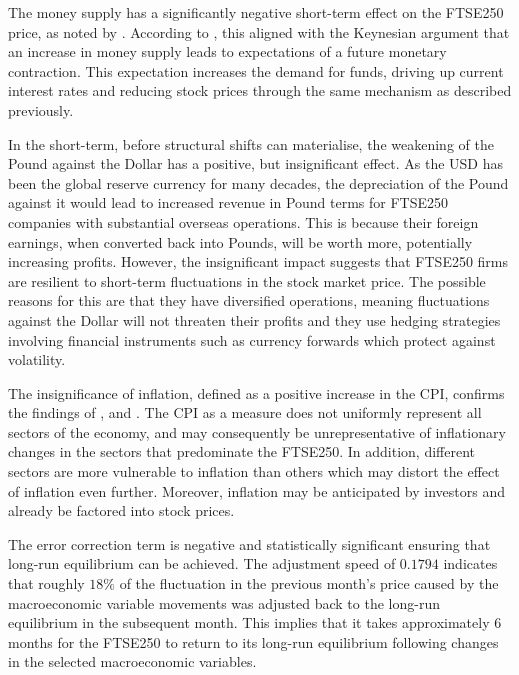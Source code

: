\documentclass[11pt,a4paper]{article}
\newcommand{\citeboth}[1]{\citeauthor{#1} \citep{#1}}
\begin{document}
The money supply has a significantly negative short-term effect on the 
FTSE250 price, as noted by \citeboth{olawale2014}. 
According to \citeboth{sellin2001}, this aligned with the Keynesian argument 
that an increase in money supply leads to expectations of a future 
monetary contraction. This expectation increases the demand for 
funds, driving up current interest rates and reducing stock prices 
through the same mechanism as described previously.

In the short-term, before structural shifts can materialise, the
weakening of the Pound against the Dollar has a positive, but 
insignificant effect. As the USD has been 
the global reserve currency for many decades, the depreciation of the Pound 
against it would lead to increased revenue in Pound terms for FTSE250 
companies with substantial overseas operations. 
This is because their foreign earnings, 
when converted back into Pounds, will be worth more, 
potentially increasing profits. However, the insignificant impact suggests 
that FTSE250 firms are resilient to short-term fluctuations in the stock market 
price. The possible reasons for this are that they have diversified 
operations, meaning fluctuations against the Dollar will not threaten 
their profits and they use hedging strategies involving financial instruments 
such as currency forwards which protect against volatility. 

The insignificance of inflation, defined as a positive 
increase in the CPI, confirms the findings of 
\citeboth{gultekin1983}, \citeboth{firth1979} and \citeboth{neifar2023}. 
The CPI as a measure does not uniformly represent all sectors of the economy, 
and may consequently be unrepresentative of inflationary changes in the 
sectors that predominate the FTSE250. In addition, different sectors 
are more vulnerable to inflation than others which may distort the effect 
of inflation even further. Moreover, inflation may be anticipated 
by investors and already be factored into stock prices.

The error correction term 
is negative and statistically significant ensuring that long-run equilibrium 
can be achieved. The adjustment speed of $0.1794$ indicates that 
roughly $18\%$ of the fluctuation in the previous month's price caused by the 
macroeconomic variable movements was adjusted back to the long-run equilibrium in the subsequent month. This implies 
that it takes approximately 6 months for the FTSE250 to return to its long-run equilibrium following 
changes in the selected macroeconomic variables.
\end{document}
